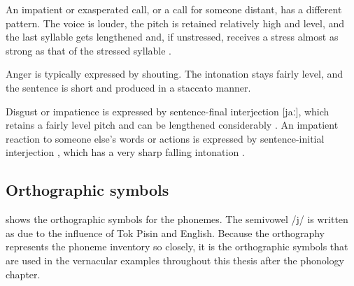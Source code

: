 An impatient or exasperated call, or a call for someone distant, has a different pattern.  The voice is louder, the pitch is retained relatively high and level, and the last syllable gets lengthened and, if unstressed, receives a stress almost as strong as that of the stressed syllable .

 


Anger is typically expressed by shouting.  The intonation stays fairly level, and the sentence is short and produced in a staccato manner.

Disgust or impatience is expressed by sentence-final interjection  [jaː], which retains a fairly level pitch and can be lengthened considerably .  An impatient reaction to someone else's words or actions is expressed by sentence-initial interjection , which has a very sharp falling intonation .





 

\subsection{Orthographic symbols}


 shows the orthographic symbols for the phonemes. The semivowel /j/ is written as  due to the influence of Tok Pisin and English.  Because the orthography represents the phoneme inventory so closely, it is the orthographic symbols that are used in the vernacular examples throughout this thesis after the phonology chapter.


